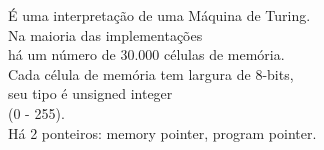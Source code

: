 \documentclass[preview]{standalone}
\begin{document}
É uma interpretação de uma Máquina de Turing.\\Na maioria das implementações\\há um número de 30.000 células de memória.\\Cada célula de memória tem largura de 8-bits,\\seu tipo é unsigned integer\\(0 - 255).\\Há 2 ponteiros: memory pointer, program pointer.\\
\end{document}
